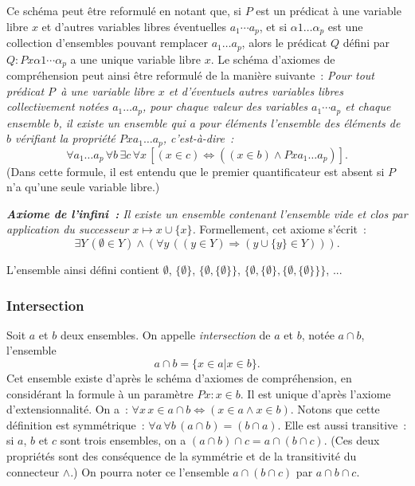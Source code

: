 Ce schéma peut être reformulé en notant que, si $P$ est un prédicat à une variable libre $x$ et d'autres variables libres éventuelles $a_1 \cdots a_p$, et si $\alpha 1 \dots \alpha_p$ est une collection d'ensembles pouvant remplacer $a_1 \dots a_p$, alors le prédicat $Q$ défini par $Q: P x \alpha1 \cdots \alpha_p$ a une unique variable libre $x$. 
Le schéma d'axiomes de compréhension peut ainsi être reformulé de la manière suivante : 
\textit{Pour tout prédicat $P$ à une variable libre $x$ et d'éventuels autres variables libres collectivement notées $a_1 \dots a_p$, pour chaque valeur des variables $a_1 \cdots a_p$ et chaque ensemble $b$, il existe un ensemble qui a pour éléments l'ensemble des éléments de $b$ vérifiant la propriété $P x a_1 \dots a_p$, c'est-à-dire :}
\begin{equation*}
\forall a_1 \dots a_p \, \forall b \, \exists c \, \forall x \, [ (x \in c) \Leftrightarrow ((x \in b) \wedge P x a_1 \dots a_p)]. 
\end{equation*}
(Dans cette formule, il est entendu que le premier quantificateur est absent si $P$ n'a qu'une seule variable libre.) 

\medskip

\noindent\textit{\textbf{Axiome de l'infini :} Il existe un ensemble contenant l'ensemble vide et clos par application du successeur $x \mapsto x \cup \lbrace x \rbrace$.} Formellement, cet axiome s'écrit : 
\begin{equation*}
    \exists Y \, (\emptyset \in Y) \wedge (\forall y \, ((y \in Y) \Rightarrow (y \cup \lbrace y \rbrace \in Y))). 
\end{equation*}

\medskip

L'ensemble ainsi défini contient $\emptyset$, $\lbrace \emptyset \rbrace$, $\lbrace \emptyset, \lbrace \emptyset \rbrace \rbrace$, $\lbrace \emptyset, \lbrace \emptyset \rbrace, \lbrace \emptyset, \lbrace \emptyset \rbrace \rbrace \rbrace$, ...

\subsubsection{Intersection} 

Soit $a$ et $b$ deux ensembles. 
On appelle \textit{intersection} de $a$ et $b$, notée $a \cap b$, l'ensemble 
\begin{equation*}
    a \cap b = \lbrace x \in a \vert x \in b \rbrace. 
\end{equation*}
Cet ensemble existe d'après le schéma d'axiomes de compréhension, en considérant la formule à un paramètre $P x: x \in b$. 
Il est unique d'après l'axiome d'extensionnalité.
On a : $\forall x \, x \in a \cap b \Leftrightarrow (x \in a \wedge x \in b)$. 
Notons que cette définition est symmétrique : $\forall a \, \forall b \, (a \cap b) = (b \cap a)$.  
Elle est aussi transitive : si $a$, $b$ et $c$ sont trois ensembles, on a $(a \cap b) \cap c = a \cap (b \cap c)$. 
(Ces deux propriétés sont des conséquence de la symmétrie et de la transitivité du connecteur $\wedge$.)
On pourra noter ce l'ensemble $a \cap (b \cap c)$ par $a \cap b \cap c$. 

